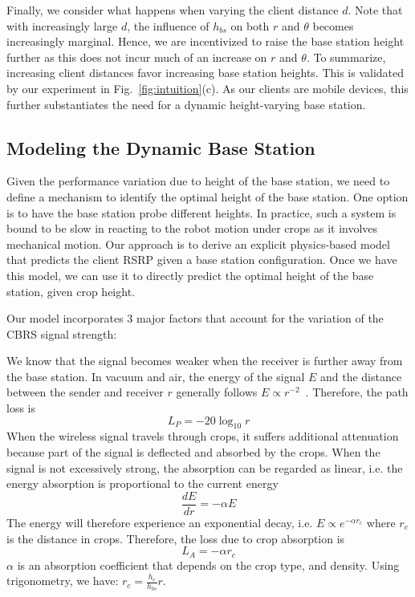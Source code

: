 Finally, we consider what happens when varying the client distance $d$. Note that with increasingly large $d$, the influence of $h_{bs}$ on both $r$ and $\theta$ becomes increasingly marginal. Hence, we are incentivized to raise the base station height further as this does not incur much of an increase on $r$ and $\theta$. To summarize, increasing client distances favor increasing base station heights. This is validated by our experiment in Fig.~\ref{fig:intuition}(c). As our clients are mobile devices, this further substantiates the need for a dynamic height-varying base station.


\subsection{Modeling the Dynamic Base Station} 

Given the performance variation due to height of the base station, we need to define a mechanism to identify the optimal height of the base station. One option is to have the base station probe different heights. In practice, such a system is bound to be slow in reacting to the robot motion under crops as it involves mechanical motion. Our approach is to derive an explicit physics-based model that predicts the client RSRP given a base station configuration. Once we have this model, we can use it to directly predict the optimal height of the base station, given crop height.


Our model incorporates 3 major factors that account for the variation of the CBRS signal strength: 


 We know that the signal becomes weaker when the receiver is further away from the base station. In vacuum and air, the energy of the signal $E$ and the distance between the sender and receiver $r$ generally follows $E\propto r^{-2}$~\cite{electrodynamics_textbook}. Therefore, the path loss is%
\begin{equation}
    \label{eqn:pass-loss}
    L_P=-20\log_{10}r%
\end{equation}
 When the wireless signal travels through crops, it suffers additional attenuation because part of the signal is deflected and absorbed by the crops. When the signal is not excessively strong, the absorption can be regarded as linear, i.e. the energy absorption is proportional to the current energy%
\begin{equation}
    \label{eqn:energy-absorption}
    \frac{dE}{dr}=-\alpha E%
\end{equation}
The energy will therefore experience an exponential decay, i.e. $E\propto e^{-\alpha r_c}$ where $r_c$ is the distance in crops. Therefore, the loss due to crop absorption is%
\begin{equation}
    \label{eqn:absorption-loss}
    L_{A}=-\alpha r_c%
\end{equation}
$\alpha$ is an absorption coefficient that depends on the crop type, and density. Using trigonometry, we have: $r_c = \frac{h_c}{h_{bs}} r$. 

